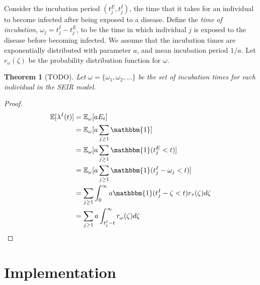 \documentclass[12pt]{article}
\newtheorem{theorem}{Theorem}
\begin{document}
Consider the incubation period $(t_j^E, t_j^I)$, the time that it takes for an individual to become infected after being exposed to a disease. Define the \textit{time of incubation}, $\omega_j = t_j^I - t_j^E$, to be the time in which individual $j$ is exposed to the disease before becoming infected. We assume that the incubation times are exponentially distributed with parameter $a$, and mean incubation period $1/a$. Let $r_\omega(\zeta)$ be the probability distribution function for $\omega$. 

\begin{theorem}[TODO]

  Let $\omega = \{\omega_1, \omega_2, \ldots\}$ be the set of incubation times for each individual in the SEIR model. 
\end{theorem}

\begin{proof}
  

\begin{align}
  \mathbb{E} [\lambda^I (t)] &= \mathbb{E}_\omega [a E_t] \\
  &= \mathbb{E}_\omega [a \sum_{j\geq 1} \mathbbm{1}] \\
  &= \mathbb{E}_\omega [a \sum_{j\geq 1} \mathbbm{1}(t_j^E < t)] \\ 
  &= \mathbb{E}_\omega [a \sum_{j\geq 1} \mathbbm{1}(t_j^I - \omega_j < t)] \\
  &= \sum_{j\geq 1} \int_0^{\infty} a \mathbbm{1}(t_j^I - \zeta < t) r_\tau(\zeta) d \zeta \\
  &= \sum_{j\geq 1} a \int_{t_j^I - t}^{\infty} r_\omega(\zeta) d\zeta \\
\end{align}


\end{proof}






\section{Implementation}
\end{document}
